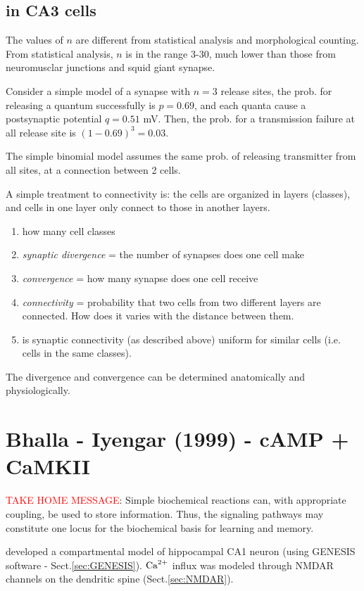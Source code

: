 \subsection{in CA3 cells}
\label{sec:ca3-cells}

The values of $n$ are different from statistical analysis and
morphological counting. From statistical analysis, $n$ is in the range
3-30, much lower than those from neuromusclar junctions and squid
giant synapse.

Consider a simple model of a synapse with $n=3$ release sites, the
prob. for releasing a quantum successfully is $p=0.69$, and each
quanta cause a postsynaptic potential $q=0.51$ mV. Then, the prob. for
a transmission failure at all release site is $(1-0.69)^3=0.03$.

The simple binomial model assumes the same prob. of releasing
transmitter from all sites, at a connection between 2 cells. 

A simple treatment to connectivity is: the cells are organized in
layers (classes), and cells in one layer only connect to those in
another layers.
\begin{enumerate}
\item how many cell classes
\item {\it synaptic divergence} = the number of synapses does one cell
  make
\item {\it convergence} = how many synapse does one cell receive
\item {\it connectivity} = probability that two cells from two
  different layers are connected. How does it varies with the distance
  between them.
\item is synaptic connectivity (as described above) uniform for
  similar cells (i.e. cells in the same classes).
\end{enumerate}
The divergence and convergence can be determined anatomically and
physiologically. 


\section{Bhalla - Iyengar (1999) - cAMP + CaMKII}
\label{sec:Bhalla-Iyengar-1999}

\textcolor{red}{TAKE HOME MESSAGE}:
Simple biochemical reactions can, with appropriate coupling, be used to store
information. Thus, the signaling pathways may constitute one locus for the
biochemical basis for learning and memory.

\citep{bhalla1999} developed a compartmental model of hippocampal CA1 neuron
(using GENESIS software - Sect.\ref{sec:GENESIS}).
${\text{Ca}^{2+}}$ influx was modeled through NMDAR channels on the dendritic spine
(Sect.\ref{sec:NMDAR}).

